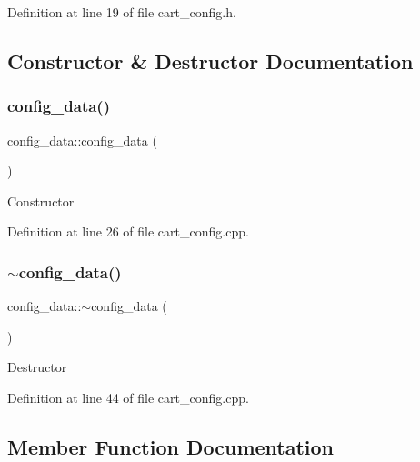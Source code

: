 Definition at line 19 of file cart\+\_\+config.\+h.



\subsection{Constructor \& Destructor Documentation}
\mbox{\label{structconfig__data_abd628560b6b09ef4b0529e8572f24f9e}} 
\subsubsection{\texorpdfstring{config\+\_\+data()}{config\_data()}}
{\footnotesize\ttfamily config\+\_\+data\+::config\+\_\+data (\begin{DoxyParamCaption}{ }\end{DoxyParamCaption})}

Constructor 

Definition at line 26 of file cart\+\_\+config.\+cpp.

\mbox{\label{structconfig__data_aed1555d45e92f85719bc56eed907c240}} 
\subsubsection{\texorpdfstring{$\sim$config\+\_\+data()}{~config\_data()}}
{\footnotesize\ttfamily config\+\_\+data\+::$\sim$config\+\_\+data (\begin{DoxyParamCaption}{ }\end{DoxyParamCaption})}

Destructor 

Definition at line 44 of file cart\+\_\+config.\+cpp.



\subsection{Member Function Documentation}
\mbox{\label{structconfig__data_a7131e30339dc86bc7e0f8c211e1a7f87}} 
